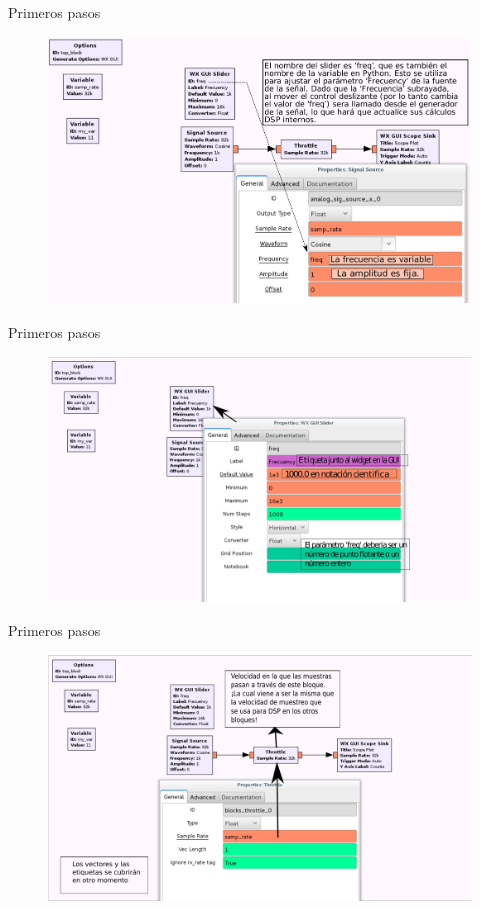 \begin{frame}{Primeros pasos}
\begin{figure}[H]
\centering
\includegraphics[width=\textwidth]{lab1/pdf/lab114.pdf}
\end{figure}
\end{frame}

\begin{frame}{Primeros pasos}
\begin{figure}[H]
\centering
\includegraphics[width=\textwidth]{lab1/pdf/lab115.pdf}
\end{figure}
\end{frame}

\begin{frame}{Primeros pasos}
\begin{figure}[H]
\centering
\includegraphics[width=\textwidth]{lab1/pdf/lab116.pdf}
\end{figure}
\end{frame}


